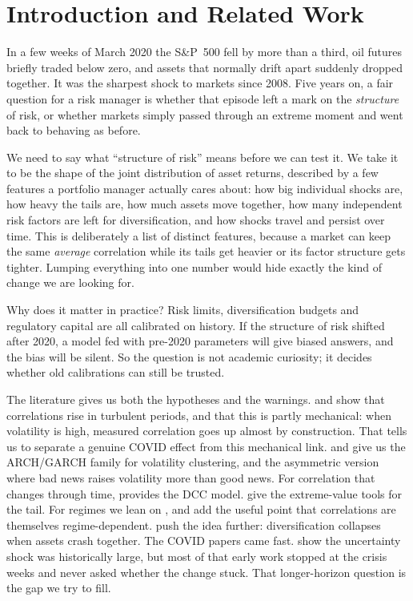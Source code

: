 \documentclass[11pt,a4paper]{article}
\begin{document}
\tableofcontents
\thispagestyle{fancy}
\newpage

% 
\section{Introduction and Related Work}
% 

In a few weeks of March 2020 the S\&P~500 fell by more than a third, oil futures briefly traded below
zero, and assets that normally drift apart suddenly dropped together. It was the sharpest shock to
markets since 2008. Five years on, a fair question for a risk manager is whether that episode left a
mark on the \emph{structure} of risk, or whether markets simply passed through an extreme moment and
went back to behaving as before.

We need to say what ``structure of risk'' means before we can test it. We take it to be the shape of the
joint distribution of asset returns, described by a few features a portfolio manager actually cares
about: how big individual shocks are, how heavy the tails are, how much assets move together, how many
independent risk factors are left for diversification, and how shocks travel and persist over time. This
is deliberately a list of distinct features, because a market can keep the same \emph{average}
correlation while its tails get heavier or its factor structure gets tighter. Lumping everything into one
number would hide exactly the kind of change we are looking for.

Why does it matter in practice? Risk limits, diversification budgets and regulatory capital are all
calibrated on history. If the structure of risk shifted after 2020, a model fed with pre-2020 parameters
will give biased answers, and the bias will be silent. So the question is not academic curiosity; it
decides whether old calibrations can still be trusted.

The literature gives us both the hypotheses and the warnings. \citet{longin2001} and \citet{forbes2002}
show that correlations rise in turbulent periods, and that this is partly mechanical: when volatility is
high, measured correlation goes up almost by construction. That tells us to separate a genuine COVID
effect from this mechanical link. \citet{engle1982} and \citet{bollerslev1986} give us the ARCH/GARCH
family for volatility clustering, and \citet{glosten1993} the asymmetric version where bad news raises
volatility more than good news. For correlation that changes through time, \citet{engle2002} provides
the DCC model. \citet{embrechts1997} give the extreme-value tools for the tail. For regimes we lean on
\citet{hamilton1989}, and \citet{ang2002} add the useful point that correlations are themselves
regime-dependent. \citet{bae2003} push the idea further: diversification collapses when assets crash
together. The COVID papers came fast. \citet{baker2020} show the uncertainty shock was historically
large, but most of that early work stopped at the crisis weeks and never asked whether the change
stuck. That longer-horizon question is the gap we try to fill.
\end{document}
